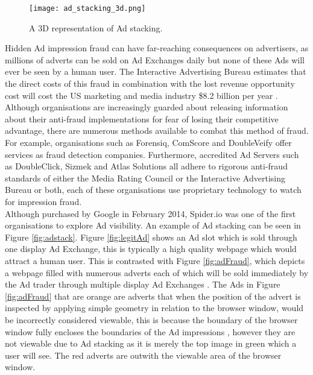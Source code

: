 \documentclass[12pt]{article}
\begin{document}
\begin{figure}[H]
    \centering
    \texttt{[image: ad\_stacking\_3d.png]}
    \caption{A 3D representation of Ad stacking.}
    \label{fig:ad_stacking_3d}
\end{figure}

Hidden Ad impression fraud can have far-reaching consequences on advertisers, as millions of adverts can be sold on Ad Exchanges daily but none of these Ads will ever be seen by a human user. The Interactive Advertising Bureau estimates that the direct costs of this fraud in combination with the lost revenue opportunity cost will cost the US marketing and media industry \$8.2 billion per year \parencite{iabfraud}. Although organisations are increasingly guarded about releasing information about their anti-fraud implementations for fear of losing their competitive advantage, there are numerous methods available to combat this method of fraud. For example, organisations such as Forensiq, ComScore and DoubleVeify offer services as fraud detection companies. Furthermore, accredited Ad Servers such as DoubleClick, Sizmek and Atlas Solutions all adhere to rigorous anti-fraud standards of either the Media Rating Council or the Interactive Advertising Bureau or both, each of these organisations use proprietary technology to watch for impression fraud. \\

Although purchased by Google in February 2014, Spider.io was one of the first organisations to explore Ad visibility. An example of Ad stacking can be seen in Figure \ref{fig:adstack}. Figure \ref{fig:legitAd} shows an Ad slot which is sold through one display Ad Exchange, this is typically a high quality webpage which would attract a human user. This is contrasted with Figure \ref{fig:adFraud}, which depicts a webpage filled with numerous adverts each of which will be sold immediately by the Ad trader through multiple display Ad Exchanges \parencite{spiderIo}. The Ads in Figure \ref{fig:adFraud} that are orange are adverts that when the position of the advert is inspected by applying simple geometry in relation to the browser window, would be incorrectly considered viewable, this is because the boundary of the browser window fully encloses the boundaries of the Ad impressions \parencite{spiderIo}, however they are not viewable due to Ad stacking as it is merely the top image in green which a user will see. The red adverts are outwith the viewable area of the browser window.  \\ 
\end{document}
